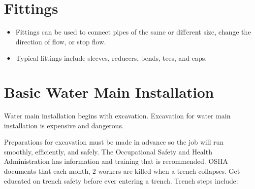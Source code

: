 \documentclass[10pt]{article}
\begin{document}
\section{Fittings}
\begin{itemize}
  \item Fittings can be used to connect pipes of the same or different size, change the direction of flow, or stop flow.

  \item Typical fittings include sleeves, reducers, bends, tees, and caps.

\end{itemize}
\section{Basic Water Main Installation}
Water main installation begins with excavation. Excavation for water main installation is expensive and dangerous.

Preparations for excavation must be made in advance so the job will run smoothly, efficiently, and safely. The Occupational Safety and Health Administration has information and training that is recommended. OSHA documents that each month, 2 workers are killed when a trench collapses. Get educated on trench safety before ever entering a trench. Trench steps include:
\end{document}
